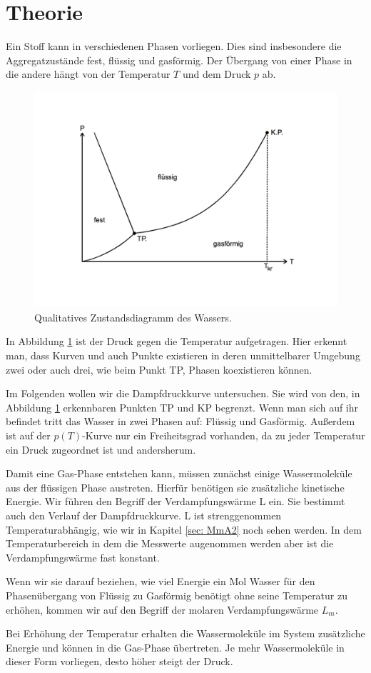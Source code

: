  \section{Theorie}
\label{sec:Theorie}

Ein Stoff kann in verschiedenen Phasen vorliegen. Dies sind insbesondere die Aggregatzustände fest, flüssig und gasförmig.
Der Übergang von einer Phase in die andere hängt von der Temperatur $T$ und dem Druck $p$ ab.

\begin{figure}
  \centering
  \includegraphics[height = 8cm]{Phasendiagramm.pdf}
  \caption{Qualitatives Zustandsdiagramm des Wassers.}
  \label{fig: Wasserdiagramm}
\end{figure}

In Abbildung \ref{fig: Wasserdiagramm} ist der Druck gegen die Temperatur aufgetragen.
Hier erkennt man, dass Kurven und auch Punkte existieren in deren unmittelbarer Umgebung zwei oder auch drei, wie beim Punkt TP, Phasen koexistieren können.

Im Folgenden wollen wir die Dampfdruckkurve untersuchen. Sie wird von den, in Abbildung \ref{fig: Wasserdiagramm} erkennbaren Punkten TP und KP
begrenzt. Wenn man sich auf ihr befindet tritt das Wasser in zwei Phasen auf: Flüssig und Gasförmig. Außerdem ist auf der $p(T)$-Kurve nur ein Freiheitsgrad
vorhanden, da zu jeder Temperatur ein Druck zugeordnet ist und andersherum.

Damit eine Gas-Phase entstehen kann, müssen zunächst einige Wassermoleküle aus der flüssigen Phase austreten. Hierfür benötigen sie zusätzliche
kinetische Energie. Wir führen den Begriff der Verdampfungswärme L ein. Sie bestimmt auch den Verlauf der Dampfdruckkurve. L ist
strenggenommen Temperaturabhängig, wie wir in Kapitel \ref{sec: MmA2} noch sehen werden. In dem Temperaturbereich in dem die Messwerte augenommen werden
aber ist die Verdampfungswärme fast konstant.

Wenn wir sie darauf beziehen, wie viel Energie ein Mol Wasser für den Phasenübergang von Flüssig zu Gasförmig benötigt ohne seine Temperatur zu
erhöhen, kommen wir auf den Begriff der molaren Verdampfungswärme $L_{m}$.

Bei Erhöhung der Temperatur erhalten die Wassermoleküle im System zusätzliche Energie und können in die Gas-Phase übertreten. Je mehr Wassermoleküle
in dieser Form vorliegen, desto höher steigt der Druck.
\newpage
